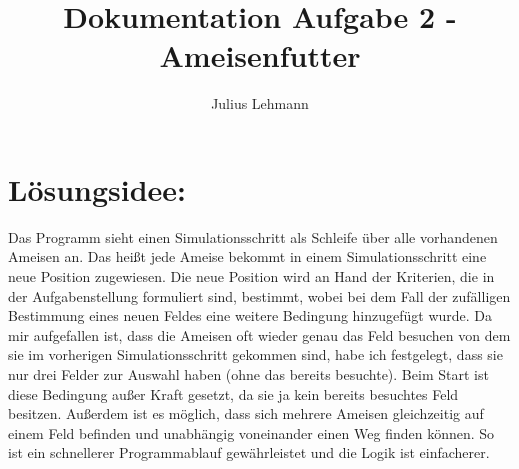 \documentclass[a4paper,12pt]{scrartcl}
\title{Dokumentation Aufgabe 2 - Ameisenfutter}
\author{Julius Lehmann}
\begin{document}
\maketitle
\section*{Lösungsidee:}
Das Programm sieht einen Simulationsschritt als Schleife über alle vorhandenen Ameisen an. Das heißt jede Ameise bekommt in einem Simulationsschritt eine neue Position zugewiesen. Die neue Position wird an Hand der Kriterien, die in der Aufgabenstellung formuliert sind, bestimmt, wobei bei dem Fall der zufälligen Bestimmung eines neuen Feldes eine weitere Bedingung hinzugefügt wurde. Da mir aufgefallen ist, dass die Ameisen oft wieder genau das Feld besuchen von dem sie im vorherigen Simulationsschritt gekommen sind, habe ich festgelegt, dass sie nur drei Felder zur Auswahl haben (ohne das bereits besuchte). Beim Start ist diese Bedingung außer Kraft gesetzt, da sie ja kein bereits besuchtes Feld besitzen.
Außerdem ist es möglich, dass sich mehrere Ameisen gleichzeitig auf einem Feld befinden und unabhängig voneinander einen Weg finden können. So ist ein schnellerer Programmablauf gewährleistet und die Logik ist einfacherer.
\end{document}
